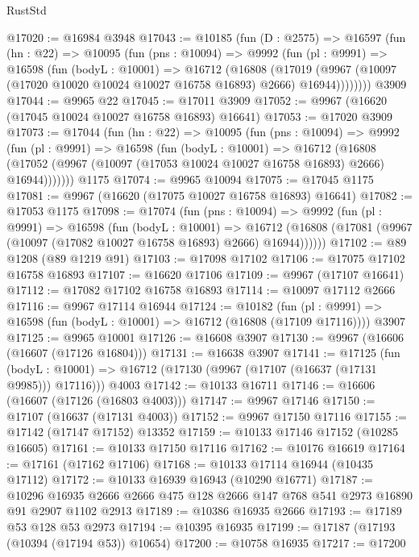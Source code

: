 \begin{lexlean}{RustStd}
\begin{coremodule}
@17020 := @16984 @3948
@17043 := @10185
    (fun (D : @2575) =>
    @16597
      (fun (hn : @22) =>
      @10095
        (fun (pns : @10094) =>
        @9992
          (fun (pl : @9991) =>
          @16598
            (fun (bodyL : @10001) =>
            @16712
              (@16808
                (@17019
                  (@9967 (@10097 (@17020 @10020 @10024 @10027 @16758 @16893) @2666) @16944))))))))
    @3909
@17044 := @9965 @22
@17045 := @17011 @3909
@17052 := @9967 (@16620 (@17045 @10024 @10027 @16758 @16893) @16641)
@17053 := @17020 @3909
@17073 := @17044
    (fun (hn : @22) =>
    @10095
      (fun (pns : @10094) =>
      @9992
        (fun (pl : @9991) =>
        @16598
          (fun (bodyL : @10001) =>
          @16712
            (@16808 (@17052 (@9967 (@10097 (@17053 @10024 @10027 @16758 @16893) @2666) @16944)))))))
    @1175
@17074 := @9965 @10094
@17075 := @17045 @1175
@17081 := @9967 (@16620 (@17075 @10027 @16758 @16893) @16641)
@17082 := @17053 @1175
@17098 := @17074
    (fun (pns : @10094) =>
    @9992
      (fun (pl : @9991) =>
      @16598
        (fun (bodyL : @10001) =>
        @16712 (@16808 (@17081 (@9967 (@10097 (@17082 @10027 @16758 @16893) @2666) @16944))))))
@17102 := @89 @1208 (@89 @1219 @91)
@17103 := @17098 @17102
@17106 := @17075 @17102 @16758 @16893
@17107 := @16620 @17106
@17109 := @9967 (@17107 @16641)
@17112 := @17082 @17102 @16758 @16893
@17114 := @10097 @17112 @2666
@17116 := @9967 @17114 @16944
@17124 := @10182
    (fun (pl : @9991) => @16598 (fun (bodyL : @10001) => @16712 (@16808 (@17109 @17116))))
    @3907
@17125 := @9965 @10001
@17126 := @16608 @3907
@17130 := @9967 (@16606 (@16607 (@17126 @16804)))
@17131 := @16638 @3907
@17141 := @17125
    (fun (bodyL : @10001) => @16712 (@17130 (@9967 (@17107 (@16637 (@17131 @9985))) @17116)))
    @4003
@17142 := @10133 @16711
@17146 := @16606 (@16607 (@17126 (@16803 @4003)))
@17147 := @9967 @17146
@17150 := @17107 (@16637 (@17131 @4003))
@17152 := @9967 @17150 @17116
@17155 := @17142 (@17147 @17152) @13352
@17159 := @10133 @17146 @17152 (@10285 @16605)
@17161 := @10133 @17150 @17116
@17162 := @10176 @16619
@17164 := @17161 (@17162 @17106)
@17168 := @10133 @17114 @16944 (@10435 @17112)
@17172 := @10133 @16939 @16943 (@10290 @16771)
@17187 := @10296
    @16935
    @2666
    @2666
    @475
    @128
    @2666
    @147
    @768
    @541
    @2973
    @16890
    @91
    @2907
    @1102
    @2913
@17189 := @10386 @16935 @2666
@17193 := @17189 @53 @128 @53 @2973
@17194 := @10395 @16935
@17199 := @17187 (@17193 (@10394 (@17194 @53)) @10654)
@17200 := @10758 @16935
@17217 := @17200

\end{coremodule}
\end{lexlean}
